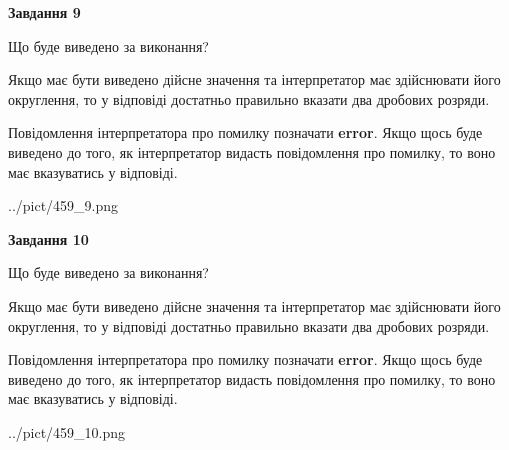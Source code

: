 \documentclass[12pt, ukrainian]{article}
\begin{document}
{\begin {Large}
{\begin {center}\textbf{Завдання 9}\end {center}}\par
Що буде виведено за виконання? \par

Якщо має бути виведено дійсне значення та інтерпретатор має здійснювати його округлення, 
то у відповіді достатньо правильно вказати два дробових розряди.

Повідомлення інтерпретатора про помилку позначати \textbf{error}.
Якщо щось буде виведено до того, як інтерпретатор видасть повідомлення про помилку, 
то воно має вказуватись у відповіді. \par

\begin{center}
	{../pict/459_9.png}
\end{center}
\newpage

{\begin {center}\textbf{Завдання 10}\end {center}}\par
Що буде виведено за виконання? \par

Якщо має бути виведено дійсне значення та інтерпретатор має здійснювати його округлення, 
то у відповіді достатньо правильно вказати два дробових розряди.

Повідомлення інтерпретатора про помилку позначати \textbf{error}.
Якщо щось буде виведено до того, як інтерпретатор видасть повідомлення про помилку, 
то воно має вказуватись у відповіді. \par

\begin{center}
	{../pict/459_10.png}
\end{center}
\newpage

\end {Large}}
\end{document}

